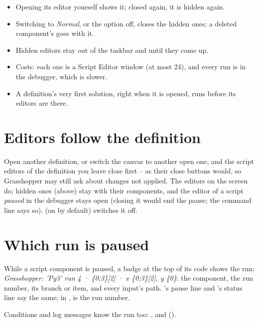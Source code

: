 \begin{itemize}
  \item Opening its editor yourself shows it; closed again, it is hidden again.
  \item Switching to \emph{Normal}, or the option off, closes the hidden ones; a deleted component's goes with it.
  \item Hidden editors stay out of the taskbar and  until they come up.
  \item Costs: each one is a Script Editor window (at most 24), and every run is in the debugger, which is slower.
  \item A definition's very first solution, right when it is opened, runs before its editors are there.
\end{itemize}

\section{Editors follow the definition}\label{sec:closeeditors}

Open another definition, or switch the canvas to another open one, and the script editors of the definition you leave
close first -- as their close buttons would, so Grasshopper may still ask about changes not applied. The editors on the
screen do; hidden ones (above) stay with their components, and the editor of a script \emph{paused} in the debugger
stays open (closing it would end the pause; the command line says so).  (on by default) switches it off.

\section{Which run is paused}\label{sec:runbadge}

While a script component is paused, a badge at the top of its code shows the run:
\emph{Grasshopper: 'Py3' run 4 · \{0;3\}[2] · x \{0;3\}[2], y \{0\}}: the component, the run number, its branch or
item, and every input's path. 's pause line and 's status line say the same; in ,
 is the run number.


Conditions and log messages know the run too: ,  and 
().


